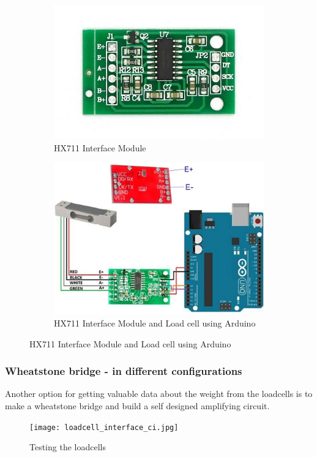 \documentclass[../report.tex]{subfiles}
\begin{document}
\begin{figure}[H]
  \centering
  \begin{subfigure}[b]{0.4\linewidth}
    \includegraphics[width=\linewidth]{image/HX711-Weighing-Sensor-Dual-Channel-24-Bit-Precision-A-D-Module-Pressure-Sensor_1.jpg}
    \caption{HX711 Interface Module }
  \end{subfigure}
  \begin{subfigure}[b]{0.4\linewidth}
    \includegraphics[width=\linewidth]{image/hx711-red.jpg}
    \caption{HX711 Interface Module and Load cell using Arduino}
  \end{subfigure}
  
  
\end{figure}

\subsubsection{Wheatstone bridge - in different configurations}

Another option for getting valuable data about the weight from the loadcells
is to make a wheatstone bridge and build a self designed amplifying circuit.

\begin{figure}[H]
  \centering
  \texttt{[image: loadcell\_interface\_ci.jpg]}
  \caption{Testing the loadcells}
\end{figure} 
\end{document}
